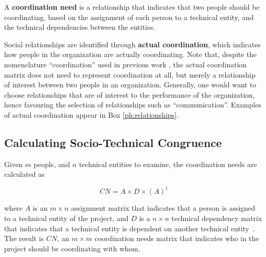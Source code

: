 
A \textbf{coordination need} is a relationship that indicates that two people should be coordinating, based on the assignment of each person to a technical entity, and the technical dependencies between the entities.

Social relationships are identified through \textbf{actual coordination}, which indicates how people in the organization are actually coordinating. Note that, despite the nomenclature ``coordination'' used in previous work \cite{cataldo:cscw:2006}, the actual coordination matrix does not need to represent coordination at all, but merely a relationship of interest between two people in an organization. Generally, one would want to choose relationships that are of interest to the performance of the organization, hence favouring the selection of relationships such as ``communication''. Examples of actual coordination appear in Box \ref{ph:relationships}.




\subsection{Calculating Socio-Technical Congruence}
\label{sec:stc}

Given $m$ people, and $n$ technical entities to examine, the coordination needs are calculated as 

\[ CN = A \times D \times (A)^t \]

\noindent where $A$ is an $m \times n$ assignment matrix that indicates that a person is assigned to a technical entity of the project, and $D$ is a $n \times n$ technical dependency matrix that indicates that a technical entity is dependent on another technical entity~\cite{cataldo:cscw:2006}. The result is $CN$, an $m \times m$ coordination needs matrix that indicates who in the project should be coordinating with whom.


